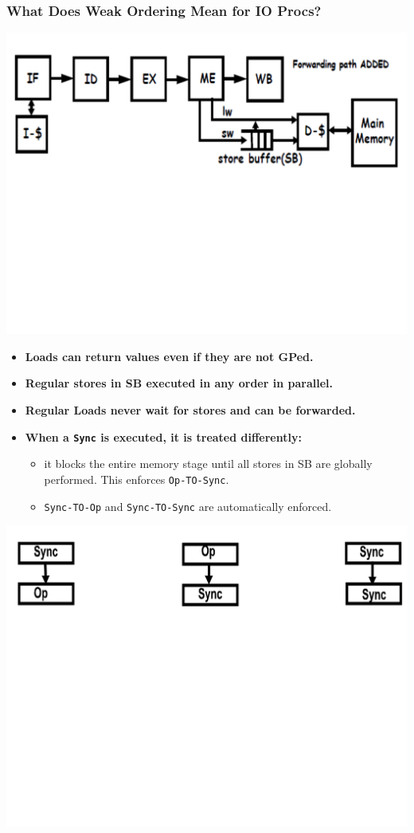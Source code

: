 \documentclass{beamer}
\renewcommand{\emph}[1]{\textcolor{structure}{#1}}
\newcommand{\emp}[1]{\textcolor{DikuRed}{ #1}}
\begin{document}
\begin{frame}[fragile,t]
\frametitle{What Does Weak Ordering Mean for IO Procs?}
\vspace{-3ex}
\includegraphics[width=55ex]{Ch7Figs/WeakOrdPipeline}
\vspace{-23ex}

\begin{itemize}
    \item \emph{\bf Loads can return values even if they are not GPed.}\smallskip

    \item \emph{\bf Regular stores in SB executed in any order in parallel.}\smallskip

    \item \emph{\bf Regular Loads never wait for stores and can be forwarded.}

    \item \emp{\bf When a {\tt Sync} is executed, it is treated differently:}
        \begin{itemize}
            \item it blocks the entire memory stage until all stores in SB
                    are globally performed. This enforces \emp{\tt Op-TO-Sync}.
            \item \emp{\tt Sync-TO-Op} and \emp{\tt Sync-TO-Sync} are automatically
                    enforced. %
        \end  {itemize}
\end{itemize}

\includegraphics[width=55ex]{Ch7Figs/WeakOrdering}

\end{frame}
\end{document}
